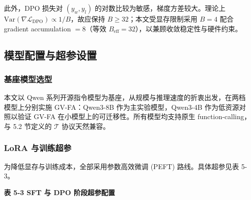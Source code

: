 \documentclass[a4paper,12pt]{ctexart}
\begin{document}
此外，DPO 损失对 $(y_w,y_l)$ 的对数比较为敏感，梯度方差较大。理论上 $\mathrm{Var}(\nabla \mathcal{L}_{\mathrm{DPO}})\propto 1/B$，故应保持 $B\geq 32$；本文受显存限制采用 $B=4$ 配合 gradient accumulation $=8$（等效 $B_{\mathrm{eff}}=32$），以兼顾收敛稳定性与硬件约束。

\subsection{模型配置与超参设置}

\subsubsection{基座模型选型}

本文以 Qwen 系列开源指令模型为基座，从规模与推理速度的折衷出发，在两档模型上分别实施 GV-FA：Qwen3-8B 作为主实验模型，Qwen3-4B 作为低资源对照以验证 GV-FA 在小模型上的可迁移性。所有模型均支持原生 function-calling，与 5.2 节定义的 $\mathcal{T}$ 协议天然兼容。

\subsubsection{LoRA 与训练超参}

为降低显存与训练成本，全部采用参数高效微调 (PEFT) 路线。具体超参见表 5-3。

\textbf{表 5-3 SFT 与 DPO 阶段超参配置}
\end{document}
